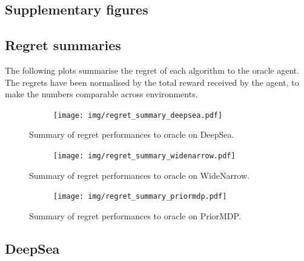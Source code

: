 \documentclass{article}
\begin{document}
\begin{appendices}
\clearpage
\section{Supplementary figures}

\subsection{Regret summaries}

The following plots summarise the regret of each algorithm to the oracle agent. The regrets have been normalised by the total reward received by the agent, to make the numbers comparable across environments.

\begin{figure}[h!]
\centering
\begin{subfigure}{0.7\textwidth}
\texttt{[image: img/regret\_summary\_deepsea.pdf]}
\end{subfigure}
\captionsetup{width=0.9\linewidth}
\caption{Summary of regret performances to oracle on DeepSea.}\label{deepsea_regret_summary}
\end{figure}

\begin{figure}[h!]
\centering
\begin{subfigure}{0.7\textwidth}
\texttt{[image: img/regret\_summary\_widenarrow.pdf]}
\end{subfigure}
\captionsetup{width=0.9\linewidth}
\caption{Summary of regret performances to oracle on WideNarrow.}\label{widenarrow_regret_summary}
\end{figure}

\begin{figure}[h!]
\centering
\begin{subfigure}{0.7\textwidth}
\texttt{[image: img/regret\_summary\_priormdp.pdf]}
\end{subfigure}
\captionsetup{width=0.9\linewidth}
\caption{Summary of regret performances to oracle on PriorMDP.}\label{priormdp_regret_summary}
\end{figure}

\clearpage

\subsection{DeepSea}


\end{appendices}
\end{document}
